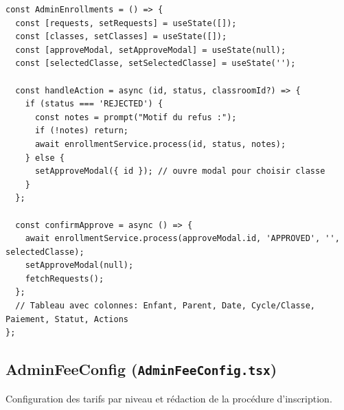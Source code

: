 \documentclass[12pt,a4paper]{article}
\begin{document}
\begin{lstlisting}[style=code]
const AdminEnrollments = () => {
  const [requests, setRequests] = useState([]);
  const [classes, setClasses] = useState([]);
  const [approveModal, setApproveModal] = useState(null);
  const [selectedClasse, setSelectedClasse] = useState('');

  const handleAction = async (id, status, classroomId?) => {
    if (status === 'REJECTED') {
      const notes = prompt("Motif du refus :");
      if (!notes) return;
      await enrollmentService.process(id, status, notes);
    } else {
      setApproveModal({ id }); // ouvre modal pour choisir classe
    }
  };

  const confirmApprove = async () => {
    await enrollmentService.process(approveModal.id, 'APPROVED', '', selectedClasse);
    setApproveModal(null);
    fetchRequests();
  };
  // Tableau avec colonnes: Enfant, Parent, Date, Cycle/Classe, Paiement, Statut, Actions
};
\end{lstlisting}

\subsection{AdminFeeConfig (\texttt{AdminFeeConfig.tsx})}

Configuration des tarifs par niveau et rédaction de la procédure d'inscription.
\end{document}
